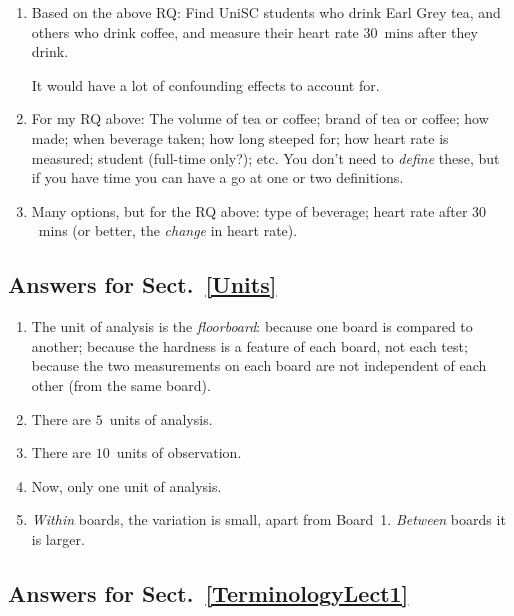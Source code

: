 \documentclass[
  11pt,
  a4paper,
  krantz2]{krantz}
\providecommand{\tightlist}{%
  \setlength{\itemsep}{0pt}\setlength{\parskip}{0pt}}
\begin{document}
\begin{footnotesize}
\begin{enumerate}
  ``Among UniSC students (P), is the average heart rate \(30\,\text{mins}\) after drinking (O) is different between those who drink a cup of Earl Grey tea and those who drinking a cup of hot coffee (C)?''
  I'm not saying this is the best; it is just an example.
\item
  Based on the above RQ: Find UniSC students who drink Earl Grey tea, and others who drink coffee, and measure their heart rate \(30\)~mins after they drink.

  It would have a lot of confounding effects to account for.
\item
  For my RQ above: The volume of tea or coffee; brand of tea or coffee; how made; when beverage taken; how long steeped for; how heart rate is measured; student (full-time only?); etc.
  You don't need to \emph{define} these, but if you have time you can have a go at one or two definitions.
\item
  Many options, but for the RQ above: type of beverage; heart rate after \(30\)~mins (or better, the \emph{change} in heart rate).
\end{enumerate}

\subsection*{Answers for Sect.~\ref{Units}}\label{answers-for-sect.-refunits}

\begin{enumerate}
\def\labelenumi{\arabic{enumi}.}
\tightlist
\item
  The unit of analysis is the \emph{floorboard}: because one board is compared to another; because the hardness is a feature of each board, not each test; because the two measurements on each board are not independent of each other (from the same board).
\item
  There are \(5\)~units of analysis.
\item
  There are \(10\)~units of observation.
\item
  Now, only one unit of analysis.
\item
  \emph{Within} boards, the variation is small, apart from Board~1.
  \emph{Between} boards it is larger.
\end{enumerate}

\subsection*{Answers for Sect.~\ref{TerminologyLect1}}\label{answers-for-sect.-refterminologylect1}


\end{footnotesize}
\end{document}
